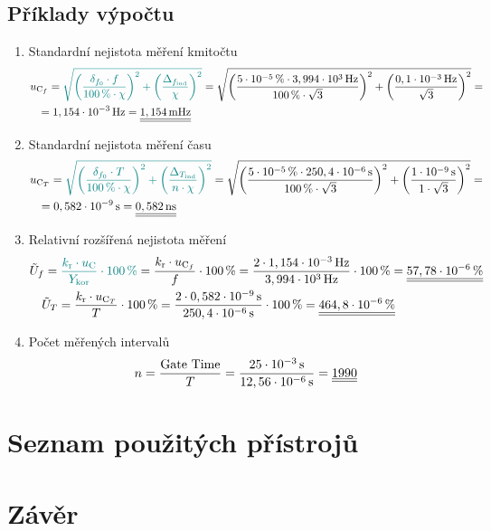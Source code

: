 \documentclass[a4paper, czech]{article}
\begin{document}
\subsection{Příklady výpočtu}

\begin{enumerate}
    \item Standardní nejistota měření kmitočtu
    \begin{multline*}
        u_{\text{C}_f} = \textcolor{teal}{\sqrt{\left(\frac{\delta_{f_0} \cdot f}{100\,\% \cdot \chi}\right)^2 + \left(\frac{\Delta_{f_\text{ind}}}{\chi}\right)^2}} = \sqrt{\left(\frac{5\cdot10^{-5}\,\% \cdot 3,994\cdot10^{3}\,\text{Hz}}{100\,\% \cdot \sqrt{3}}\right)^2 + \left(\frac{0,1\cdot10^{-3}\,\text{Hz}}{\sqrt{3}}\right)^2} = \hfill \\
        \ \ \ = 1,154\cdot10^{-3}\,\text{Hz} = \underline{\underline{1,154\,\text{mHz}}} \hfill
    \end{multline*}
    \item Standardní nejistota měření času
    \begin{multline*}
        u_{\text{C}_T} = \textcolor{teal}{\sqrt{\left(\frac{\delta_{f_0} \cdot T}{100\,\% \cdot \chi}\right)^2 + \left(\frac{\Delta_{T_\text{ind}}}{n \cdot \chi}\right)^2}} = \sqrt{\left(\frac{5\cdot10^{-5}\,\% \cdot 250,4\cdot10^{-6}\,\text{s}}{100\,\% \cdot \sqrt{3}}\right)^2 + \left(\frac{1\cdot10^{-9}\,\text{s}}{1 \cdot \sqrt{3}}\right)^2} = \hfill \\
        \ \ \ = 0,582\cdot10^{-9}\,\text{s} = \underline{\underline{0,582\,\text{ns}}} \hfill
    \end{multline*}
    \item Relativní rozšířená nejistota měření
    \begin{multline*}
        \tilde{U}_f = \textcolor{teal}{\frac{k_\text{r} \cdot u_\text{C}}{Y_\text{kor}} \cdot 100\,\%} = \frac{k_\text{r} \cdot u_{\text{C}_f}}{f} \cdot 100\,\% = \frac{2 \cdot 1,154\cdot10^{-3}\,\text{Hz}}{3,994\cdot10^{3}\,\text{Hz}} \cdot 100\,\% = \underline{\underline{57,78\cdot10^{-6}\,\%}} \hfill \\
        \ \ \ \tilde{U}_T = \frac{k_\text{r} \cdot u_{\text{C}_T}}{T} \cdot 100\,\% = \frac{2 \cdot 0,582\cdot10^{-9}\,\text{s}}{250,4\cdot10^{-6}\,\text{s}} \cdot 100\,\% = \underline{\underline{464,8\cdot10^{-6}\,\%}} \hfill
    \end{multline*}
    \item Počet měřených intervalů
    \begin{multline*}
        n = \frac{\text{Gate Time}}{T} = \frac{25\cdot10^{-3}\,\text{s}}{12,56\cdot10^{-6}\,\text{s}} = \underline{\underline{1990}} \hfill
    \end{multline*}
\end{enumerate}

\section{Seznam použitých přístrojů}

\section{Závěr}
\end{document}
